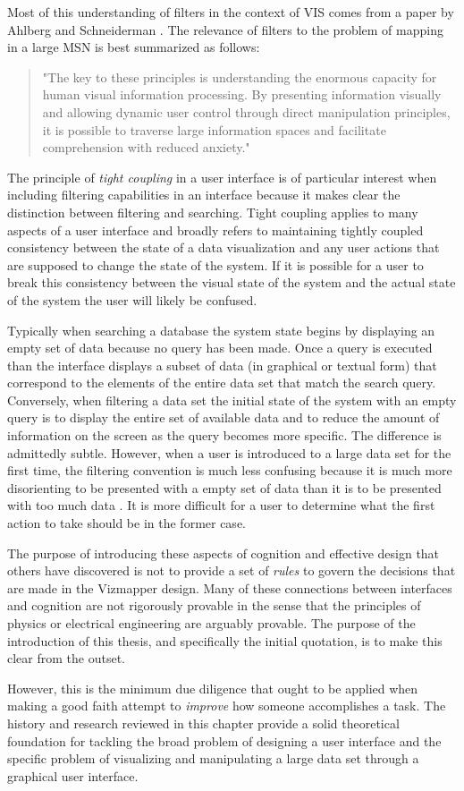 Most of this understanding of filters in the context of VIS comes from a paper by Ahlberg and Schneiderman \cite{seeking1994}. The relevance of filters to the problem of mapping in a large MSN is best summarized as follows:

\begin{quote}
"The key to these principles is understanding the enormous capacity for human visual information processing. By presenting information visually and allowing dynamic user control through direct manipulation principles, it is possible to traverse large information spaces and facilitate comprehension with reduced anxiety." \cite{seeking1994}
\end{quote}

The principle of \emph{tight coupling} in a user interface is of particular interest when including filtering capabilities in an interface because it makes clear the distinction between filtering and searching. Tight coupling applies to many aspects of a user interface and broadly refers to maintaining tightly coupled consistency between the state of a data visualization and any user actions that are supposed to change the state of the system. If it is possible for a user to break this consistency between the visual state of the system and the actual state of the system the user will likely be confused. 

Typically when searching a database the system state begins by displaying an empty set of data because no query has been made. Once a query is executed than the interface displays a subset of data (in graphical or textual form) that correspond to the elements of the entire data set that match the search query. Conversely, when filtering a data set the initial state of the system with an empty query is to display the entire set of available data and to reduce the amount of information on the screen as the query becomes more specific. The difference is admittedly subtle. However, when a user is introduced to a large data set for the first time, the filtering convention is much less confusing because it is much more disorienting to be presented with a empty set of data than it is to be presented with too much data \cite{seeking1994}. It is more difficult for a user to determine what the first action to take should be in the former case.

The purpose of introducing these aspects of cognition and effective design that others have discovered is not to provide a set of \emph{rules} to govern the decisions that are made in the Vizmapper design. Many of these connections between interfaces and cognition are not rigorously provable in the sense that the principles of physics or electrical engineering are arguably provable. The purpose of the introduction of this thesis, and specifically the initial quotation, is to make this clear from the outset. 

However, this is the minimum due diligence that ought to be applied when making a good faith attempt to \emph{improve} how someone accomplishes a task. The history and research reviewed in this chapter provide a solid theoretical foundation for tackling the broad problem of designing a user interface and the specific problem of visualizing and manipulating a large data set through a graphical user interface. 

